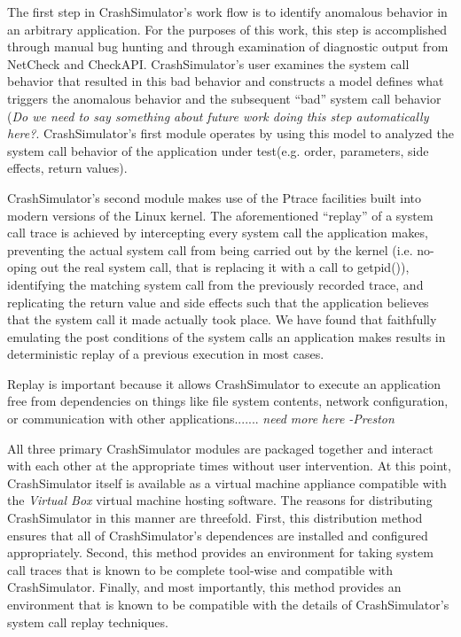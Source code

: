     The first step in CrashSimulator's work flow is to identify anomalous behavior in an arbitrary application. For the
    purposes of this work, this step is accomplished through manual bug hunting and through examination of diagnostic
    output from NetCheck and CheckAPI. CrashSimulator's user examines the system call behavior that resulted in this bad
    behavior and constructs a model defines what triggers the anomalous behavior and the subsequent ``bad'' system call
    behavior (\emph{Do we need to say something about future work doing this step automatically here?}.
    CrashSimulator's first module operates by using this model to analyzed the system call behavior of the application
    under test(e.g. order, parameters, side effects, return values).
        
    CrashSimulator's second module makes use of the Ptrace facilities built into modern versions of the Linux
    kernel. The aforementioned ``replay'' of a system call trace is achieved by intercepting every system call the
    application makes, preventing the actual system call from being carried out by the kernel (i.e. no-oping out the
    real system call, that is replacing it with a call to getpid()), identifying the matching system call from the
    previously recorded trace, and replicating the return value and side effects such that the application believes that
    the system call it made actually took place. We have found that faithfully emulating the post conditions of the
    system calls an application makes results in deterministic replay of a previous execution in most cases.

    Replay is important because it allows CrashSimulator to execute an application free from dependencies on things like
    file system contents, network configuration, or communication with other applications....... \emph{need more here
      -Preston}

    All three primary CrashSimulator modules are packaged together and interact with each other at the appropriate times
    without user intervention. At this point, CrashSimulator itself is available as a virtual machine appliance
    compatible with the \emph{Virtual Box} virtual machine hosting software. The reasons for distributing CrashSimulator
    in this manner are threefold. First, this distribution method ensures that all of CrashSimulator's dependences are
    installed and configured appropriately. Second, this method provides an environment for taking system call traces
    that is known to be complete tool-wise and compatible with CrashSimulator. Finally, and most importantly, this
    method provides an environment that is known to be compatible with the details of CrashSimulator's system call
    replay techniques.


